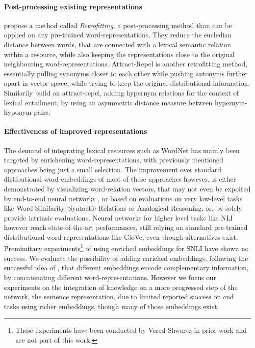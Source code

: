 \paragraph*{Post-processing existing representations}
 \cite{faruqui2015retrofitting} propose a method called \textit{Retrofitting}, a post-processing method than can be applied on any pre-trained word-representations. They reduce the eucledian distance between words, that are connected with a lexical semantic relation within a resource, while also keeping the representations close to the original neighbouring word-representations. Attract-Repel \citep{mrkvsic2017semantic} is another retrofitting method, essentially pulling synonyms closer to each other while pushing antonyms further apart in vector space, while trying to keep the original distributional information. Similarily \cite{vulic2017specialising} build on attract-repel, adding hypernym relations for the context of lexical entailment, by using an asymmetric distance measure between hypernym-hyponym pairs.
 
\paragraph*{Effectiveness of improved representations}
The demand of integrating lexical resources such as WordNet has mainly been targeted by enrichening word-representations, with previously mentioned approaches being just a small selection. The improvement over standard distibutional word-embeddings of most of these approaches however, is either demonstrated by visualizing word-relation vectors, that may not even be expoited by end-to-end neural networks \citep{levy2015improving}, or based on evaluations on very low-level tasks like Word-Similarity, Syntactic Relations or Analogical Reasoning, or, by solely provide intrinsic evaluations. Neural networks for higher level tasks like \ac{NLI} however reach state-of-the-art performances, still relying on standard pre-trained distributional word-representations like GloVe, even though alternatives exist. Premimitary experiments\footnote{These experiments have been conducted by Vered Shwartz in prior work and are not part of this work.} of using enriched embeddings for \ac{SNLI} have shown no success. We evaluate the possibility of adding enriched embeddings, following the successful idea of \cite{ruckle2018concatenated}, that different embeddings encode complementary information, by concatenating different word-representations. However we focus our experiments on the integration of knowledge on a more progressed step of the network, the sentence representation, due to limited reported success on end tasks using richer embeddings, though many of those embeddings exist.
